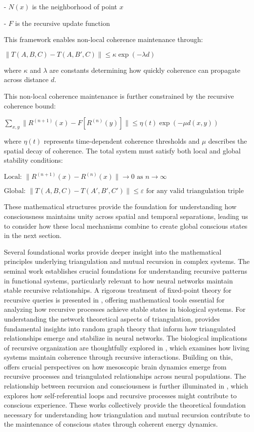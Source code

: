 \begin{refsection}
- $N(x)$ is the neighborhood of point $x$

- $F$ is the recursive update function

This framework enables non-local coherence maintenance through:

$\|T(A,B,C) - T(A,B',C)\| \leq \kappa \exp(-\lambda d)$

where $\kappa$ and $\lambda$ are constants determining how quickly coherence can propagate across distance $d$.

This non-local coherence maintenance is further constrained by the recursive coherence bound:

$\sum_{x,y} \|R^{(n+1)}(x) - F[R^{(n)}(y)]\| \leq \eta(t)\exp(-\mu d(x,y))$

where $\eta(t)$ represents time-dependent coherence thresholds and $\mu$ describes the spatial decay of coherence. The total system must satisfy both local and global stability conditions:

$\text{Local: } \|R^{(n+1)}(x) - R^{(n)}(x)\| \rightarrow 0 \text{ as } n \rightarrow \infty$

$\text{Global: } \|T(A,B,C) - T(A',B',C')\| \leq \varepsilon \text{ for any valid triangulation triple}$

These mathematical structures provide the foundation for understanding how consciousness maintains unity across spatial and temporal separations, leading us to consider how these local mechanisms combine to create global conscious states in the next section.

Several foundational works provide deeper insight into the mathematical principles underlying triangulation and mutual recursion in complex systems. The seminal work \cite{Bird1988} establishes crucial foundations for understanding recursive patterns in functional systems, particularly relevant to how neural networks maintain stable recursive relationships. A rigorous treatment of fixed-point theory for recursive queries is presented in \cite{Alegre2017}, offering mathematical tools essential for analyzing how recursive processes achieve stable states in biological systems. For understanding the network theoretical aspects of triangulation, \cite{Erdos1959} provides fundamental insights into random graph theory that inform how triangulated relationships emerge and stabilize in neural networks. The biological implications of recursive organization are thoughtfully explored in \cite{Maturana1987}, which examines how living systems maintain coherence through recursive interactions. Building on this, \cite{Freeman2000} offers crucial perspectives on how mesoscopic brain dynamics emerge from recursive processes and triangulated relationships across neural populations. The relationship between recursion and consciousness is further illuminated in \cite{Hofstadter2007}, which explores how self-referential loops and recursive processes might contribute to conscious experience. These works collectively provide the theoretical foundation necessary for understanding how triangulation and mutual recursion contribute to the maintenance of conscious states through coherent energy dynamics.


\end{refsection}
